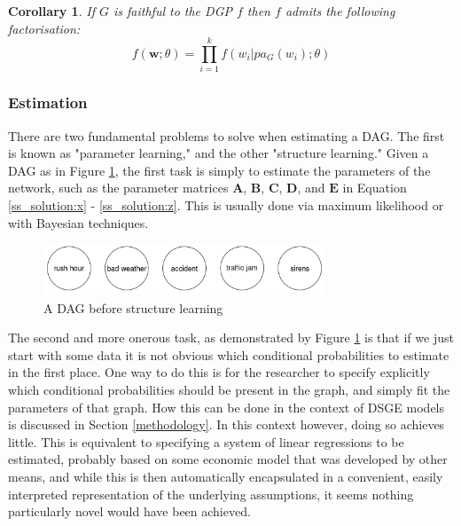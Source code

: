 \documentclass{article}
\newtheorem{corollary}{Corollary}
\begin{document}
\theoremstyle{corollary}
\begin{corollary}
  If $G$ is faithful to the DGP $f$ then $f$ admits the following factorisation:
  \begin{equation}
    f(\mathbf{w};\theta) = \prod_{i=1}^{k} f(w_i | pa_G(w_i);\theta)
  \end{equation}
\end{corollary}

\subsubsection{Estimation} \label{dag_estimation}

There are two fundamental problems to solve when estimating a DAG. The first is known as "parameter learning," and the other "structure learning." Given a DAG as in Figure \ref{dag2}, the first task is simply to estimate the parameters of the network, such as the parameter matrices $\mathbf{A}$, $\mathbf{B}$, $\mathbf{C}$, $\mathbf{D}$, and $\mathbf{E}$ in Equation \ref{ss_solution:x} - \ref{ss_solution:z}. This is usually done via maximum likelihood or with Bayesian techniques.

\begin{figure}
  \centering
  \includegraphics[width=0.75\textwidth]{images/trafficjam_unfit.png}
  \caption{A DAG before structure learning}
  \label{dag2}
\end{figure}

The second and more onerous task, as demonstrated by Figure \ref{dag2} is that if we just start with some data it is not obvious which conditional probabilities to estimate in the first place. One way to do this is for the researcher to specify explicitly which conditional probabilities should be present in the graph, and simply fit the parameters of that graph. How this can be done in the context of DSGE models is discussed in Section \ref{methodology}. In this context however, doing so achieves little. This is equivalent to specifying a system of linear regressions to be estimated, probably based on some economic model that was developed by other means, and while this is then automatically encapsulated in a convenient, easily interpreted representation of the underlying assumptions, it seems nothing particularly novel would have been achieved. 
\end{document}
